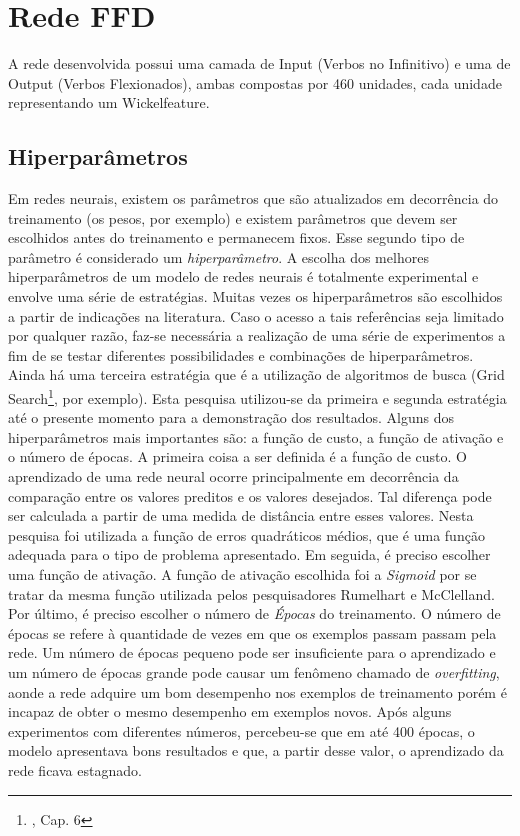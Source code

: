 \section{Rede FFD}
\label{sec:ffd}

A rede desenvolvida possui uma camada de Input (Verbos no Infinitivo) e uma de Output (Verbos Flexionados), ambas compostas por 460 unidades, cada unidade representando um Wickelfeature.

\subsection{Hiperparâmetros}

Em redes neurais, existem os parâmetros que são atualizados em decorrência do treinamento (os pesos, por exemplo) e existem parâmetros que devem ser escolhidos antes do treinamento e permanecem fixos. Esse segundo tipo de parâmetro é considerado um \textit{hiperparâmetro}. A escolha dos melhores hiperparâmetros de um modelo de redes neurais é totalmente experimental e envolve uma série de estratégias. Muitas vezes os hiperparâmetros são escolhidos a partir de indicações na literatura. Caso o acesso a tais referências seja limitado por qualquer razão, faz-se necessária a realização de uma série de experimentos a fim de se testar diferentes possibilidades e combinações de hiperparâmetros. Ainda há uma terceira estratégia que é a utilização de algoritmos de busca (Grid Search\footnote{\cite{Goodfellow-et-al-2016}, Cap. 6}, por exemplo). Esta pesquisa utilizou-se da primeira e segunda estratégia até o presente momento para a demonstração dos resultados. Alguns dos hiperparâmetros mais importantes são: a função de custo, a função de ativação e o número de épocas. A primeira coisa a ser definida é a função de custo. O aprendizado de uma rede neural ocorre principalmente em decorrência da comparação entre os valores preditos e os valores desejados. Tal diferença pode ser calculada a partir de uma medida de distância entre esses valores. Nesta pesquisa foi utilizada a função de erros quadráticos médios, que é uma função adequada para o tipo de problema apresentado. Em seguida, é preciso escolher uma função de ativação. A função de ativação escolhida foi a \textit{Sigmoid} por se tratar da mesma função utilizada pelos pesquisadores Rumelhart e McClelland. Por último, é preciso escolher o número de \textit{Épocas} do treinamento. O número de épocas se refere à quantidade de vezes em que os exemplos passam passam pela rede. Um número de épocas pequeno pode ser insuficiente para o aprendizado e um número de épocas grande pode causar um fenômeno chamado de \textit{overfitting}, aonde a rede adquire um bom desempenho nos exemplos de treinamento porém é incapaz de obter o mesmo desempenho em exemplos novos. Após alguns experimentos com diferentes números, percebeu-se que em até 400 épocas, o modelo apresentava bons resultados e que, a partir desse valor, o aprendizado da rede ficava estagnado.

